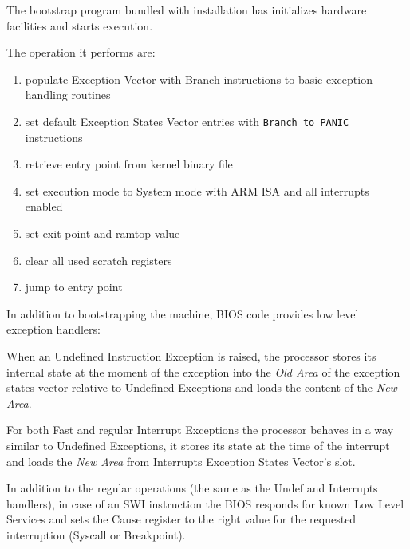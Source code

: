 


The bootstrap program bundled with \uarm{} installation has initializes hardware facilities and starts execution.

The operation it performs are:

\begin{enumerate}
\item populate Exception Vector with Branch instructions to basic exception handling routines
\item set default Exception States Vector entries with \texttt{Branch to PANIC} instructions
\item retrieve entry point from kernel binary file
\item set execution mode to System mode with ARM ISA and all interrupts enabled
\item set exit point and ramtop value
\item clear all used scratch registers
\item jump to entry point
\end{enumerate}


In addition to bootstrapping the machine, BIOS code provides low level exception handlers:


When an Undefined Instruction Exception is raised, the processor stores its internal state at the moment of the exception into the \emph{Old Area} of the exception states vector relative to Undefined Exceptions and loads the content of the \emph{New Area}.


For both Fast and regular Interrupt Exceptions the processor behaves in a way similar to Undefined Exceptions, it stores its state at the time of the interrupt and loads the \emph{New Area} from Interrupts Exception States Vector's slot.


In addition to the regular operations (the same as the Undef and Interrupts handlers), in case of an SWI instruction the BIOS responds for known Low Level Services and sets the Cause register to the right value for the requested interruption (Syscall or Breakpoint).

